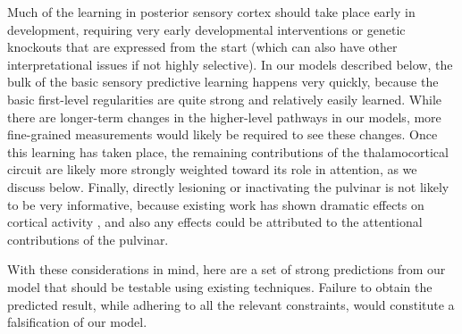\documentclass[11pt,twoside]{article}
\newif\myifpdf
\begin{document}
Much of the learning in posterior sensory cortex should take place early in development, requiring very early developmental interventions or genetic knockouts that are expressed from the start (which can also have other interpretational issues if not highly selective).  In our models described below, the bulk of the basic sensory predictive learning happens very quickly, because the basic first-level regularities are quite strong and relatively easily learned.  While there are longer-term changes in the higher-level pathways in our models, more fine-grained measurements would likely be required to see these changes.  Once this learning has taken place, the remaining contributions of the thalamocortical circuit are likely more strongly weighted toward its role in attention, as we discuss below.  Finally, directly lesioning or inactivating the pulvinar is not likely to be very informative, because existing work has shown dramatic effects on cortical activity \citep{ZhouSchaferDesimone16,PurushothamanMarionLiEtAl12}, and also any effects could be attributed to the attentional contributions of the pulvinar.

With these considerations in mind, here are a set of strong predictions from our model that should be testable using existing techniques.  Failure to obtain the predicted result, while adhering to all the relevant constraints, would constitute a falsification of our model.
\end{document}
